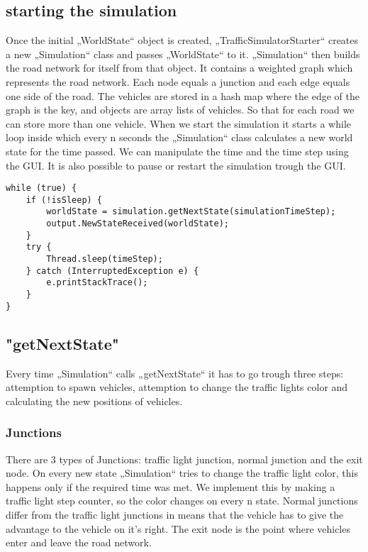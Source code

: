 \documentclass[a4paper,12pt]{article}
\begin{document}
\subsection{starting the simulation}
Once the initial „WorldState“ object is created,  „TrafficSimulatorStarter“  creates a new „Simulation“ class and passes „WorldState“  to it. „Simulation“ then builds the road network for itself from that object. It contains a weighted graph which represents the road network. Each node equals a junction and each edge equals one side of the road. The vehicles are stored in a hash map where the edge of the graph is the key, and objects are array lists of vehicles. So that for each road we can store more than one vehicle.
\newline
When we start the simulation it starts a while loop inside which every n seconds the „Simulation“ class calculates a new world state for the time passed. We can manipulate the time and the time step using the GUI. It is also possible to pause or restart the simulation trough the GUI.

\begin{lstlisting}
while (true) {
	if (!isSleep) {
		worldState = simulation.getNextState(simulationTimeStep);
		output.NewStateReceived(worldState);
	}
	try {
		Thread.sleep(timeStep);
	} catch (InterruptedException e) {
		e.printStackTrace();
	}
}
\end{lstlisting}

\subsection{"getNextState"}
Every time „Simulation“ calls „getNextState“ it has to go trough three steps: attemption to spawn vehicles, attemption to change the traffic lights color and calculating the new positions of vehicles.\newline
\subsubsection{Junctions}
There are 3 types of Junctions: traffic light junction, normal junction and the exit node. On every new state „Simulation“ tries to change the traffic light color, this happens only if the required time was met. We implement this by making a traffic light step counter, so the color changes on every n state. Normal junctions differ from the traffic light junctions in means that the vehicle has to give the advantage to the vehicle on it's right. The exit node is the point where vehicles enter and leave the road network.
\newline
\end{document}
